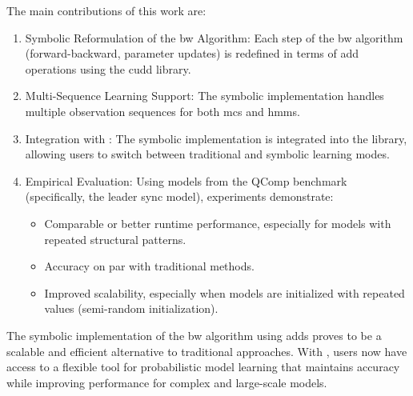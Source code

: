 \documentclass[a4paper]{article}
\begin{document}
The main contributions of this work are:
\begin{enumerate}
    \item Symbolic Reformulation of the \gls{bw} Algorithm: Each step of the \gls{bw} algorithm (forward-backward, parameter updates) is redefined in terms of \gls{add} operations using the \gls{cudd} library.
    \item Multi-Sequence Learning Support: The symbolic implementation handles multiple observation sequences for both \glspl{mc} and \glspl{hmm}.
    \item Integration with \Jajapy: The symbolic implementation is integrated into the \Jajapy library, allowing users to switch between traditional and symbolic learning modes.
    \item Empirical Evaluation: Using models from the QComp benchmark (specifically, the leader sync model), experiments demonstrate:
          \begin{itemize}
              \item Comparable or better runtime performance, especially for models with repeated structural patterns.
              \item Accuracy on par with traditional methods.
              \item Improved scalability, especially when models are initialized with repeated values (semi-random initialization).
          \end{itemize}
\end{enumerate}


The symbolic implementation of the \gls{bw} algorithm using \glspl{add} proves to be a scalable and efficient alternative to traditional approaches.
With \JajapyTwo, users now have access to a flexible tool for probabilistic model learning that maintains accuracy while improving performance for complex and large-scale models.
\end{document}
